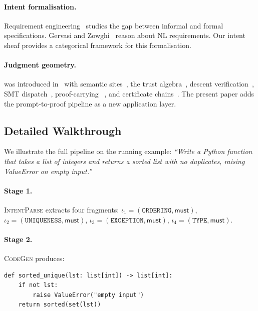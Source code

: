 \documentclass[11pt]{article}
\newcommand{\IntentFrag}{\iota}
\newcommand{\IntentParse}{\textsc{IntentParse}}
\newcommand{\CodeGen}{\textsc{CodeGen}}
\begin{document}
\paragraph{Intent formalisation.}
Requirement engineering~\cite{Lamsweerde2009Requirements} studies the
gap between informal and formal specifications.
Gervasi and Zowghi~\cite{Gervasi2005Reasoning} reason about NL
requirements.  Our intent sheaf provides a categorical framework for
this formalisation.

\paragraph{Judgment geometry.}
\JuGeo{} was introduced in~\cite{Young2025seminal} with semantic
sites~\cite{Young2025sites}, the trust algebra~\cite{Young2025trust},
descent verification~\cite{Young2025descent}, SMT
dispatch~\cite{Young2025smt}, proof-carrying
\Python{}~\cite{Young2025pcp}, and certificate
chains~\cite{Young2025chains}.  The present paper adds the
prompt-to-proof pipeline as a new application layer.

\subsection{Detailed Walkthrough}\label{sec:walkthrough}

We illustrate the full pipeline on the running example:
\emph{``Write a Python function that takes a list of integers and
returns a sorted list with no duplicates, raising ValueError on empty
input.''}

\paragraph{Stage 1.}
\IntentParse{} extracts four fragments:
$\IntentFrag_1 = (\texttt{ORDERING}, \textsf{must})$,
$\IntentFrag_2 = (\texttt{UNIQUENESS}, \textsf{must})$,
$\IntentFrag_3 = (\texttt{EXCEPTION}, \textsf{must})$,
$\IntentFrag_4 = (\texttt{TYPE}, \textsf{must})$.

\paragraph{Stage 2.}
\CodeGen{} produces:
\begin{lstlisting}[caption={Generated code for running example.},label={lst:running-gen}]
def sorted_unique(lst: list[int]) -> list[int]:
    if not lst:
        raise ValueError("empty input")
    return sorted(set(lst))
\end{lstlisting}
\end{document}
